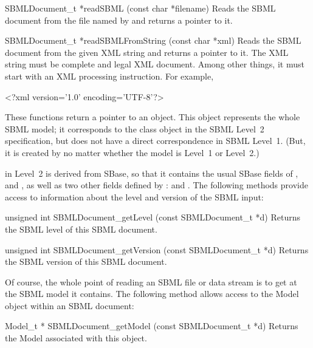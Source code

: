 \documentclass{sbmlmanual}
\begin{document}
\begin{methoddef}{SBMLDocument\_t *readSBML (const char *filename)}
  Reads the SBML document from the file named by  and
  returns a pointer to it.
\end{methoddef}

\begin{methoddef}{SBMLDocument\_t *readSBMLFromString (const char *xml)}
  Reads the SBML document from the given XML string and returns a pointer
  to it.
  The XML string must be complete and legal XML document.  Among other
  things, it must start with an XML processing instruction.  For example,
  \begin{xmlVerbatim}
    <?xml version='1.0' encoding='UTF-8'?>
  \end{xmlVerbatim}
\end{methoddef}


These functions return a pointer to an  object.
This object represents the whole SBML model; it corresponds to the
 class object in the SBML Level~2 specification, but does not
have a direct correspondence in SBML Level~1.  (But, it is created by
\libsbml{} no matter whether the model is Level~1 or Level~2.)

 in Level~2 is derived from SBase, so that it
contains the usual SBase fields of ,  and
, as well as two other fields defined by :
 and .  The following methods provide access
to information about the level and version of the SBML input:


\begin{methoddef}{unsigned int SBMLDocument\_getLevel (const SBMLDocument\_t *d)}
  Returns the SBML level of this SBML document.
\end{methoddef}


\begin{methoddef}{unsigned int SBMLDocument\_getVersion (const SBMLDocument\_t *d)}
  Returns the SBML version of this SBML document.
\end{methoddef}


Of course, the whole point of reading an SBML file or data stream is to get
at the SBML model it contains.  The following method allows access to the
Model object within an SBML document:


\begin{methoddef}{Model\_t * SBMLDocument\_getModel (const SBMLDocument\_t *d)}
  Returns the Model associated with this  object.
\end{methoddef}
\end{document}
